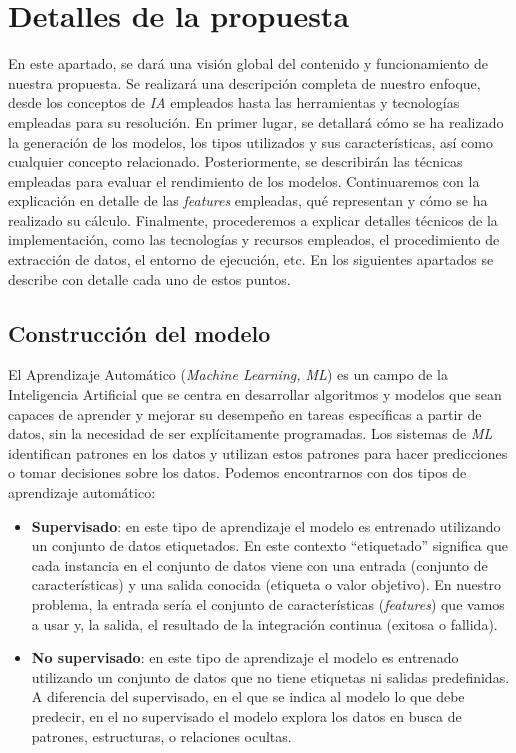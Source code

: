 \section{Detalles de la propuesta}
En este apartado, se dará una visión global del contenido y funcionamiento de nuestra propuesta.
Se realizará una descripción completa de nuestro enfoque, desde los conceptos de \textit{IA}
empleados hasta las herramientas y tecnologías empleadas para su resolución. En primer lugar, se
detallará cómo se ha realizado la generación de los modelos, los tipos utilizados y sus
características, así como cualquier concepto relacionado. Posteriormente, se describirán las
técnicas empleadas para evaluar el rendimiento de los modelos. Continuaremos con la explicación
en detalle de las \textit{features} empleadas, qué representan y cómo se ha realizado su cálculo.
Finalmente, procederemos a explicar detalles técnicos de la implementación, como las tecnologías
y recursos empleados, el procedimiento de extracción de datos, el entorno de ejecución, etc. En
los siguientes apartados se describe con detalle cada uno de estos puntos.

\subsection{Construcción del modelo}

El Aprendizaje Automático (\textit{Machine Learning, ML})
es un campo de la Inteligencia Artificial que se centra en desarrollar algoritmos y modelos que
sean capaces de aprender y mejorar su desempeño en tareas específicas a partir de datos, sin la
necesidad de ser explícitamente programadas. Los sistemas de \textit{ML} identifican patrones en
los datos y utilizan estos patrones para hacer predicciones o tomar decisiones sobre los datos.
Podemos encontrarnos con dos tipos de aprendizaje automático:

\begin{itemize}
	\item \textbf{Supervisado}: en este tipo de aprendizaje el modelo es entrenado utilizando un
    conjunto de datos etiquetados. En este contexto ``etiquetado'' significa que cada instancia
    en el conjunto de datos viene con una entrada (conjunto de características) y una salida
    conocida (etiqueta o valor objetivo). En nuestro problema, la entrada sería el conjunto de
    características (\textit{features}) que vamos a usar y, la salida, el resultado de la
    integración continua (exitosa o fallida).
	\item \textbf{No supervisado}: en este tipo de aprendizaje el modelo es entrenado utilizando
    un conjunto de datos que no tiene etiquetas ni salidas predefinidas. A diferencia del
    supervisado, en el que se indica al modelo lo que debe predecir, en el no supervisado el
    modelo explora los datos en busca de patrones, estructuras, o relaciones ocultas.
\end{itemize}

